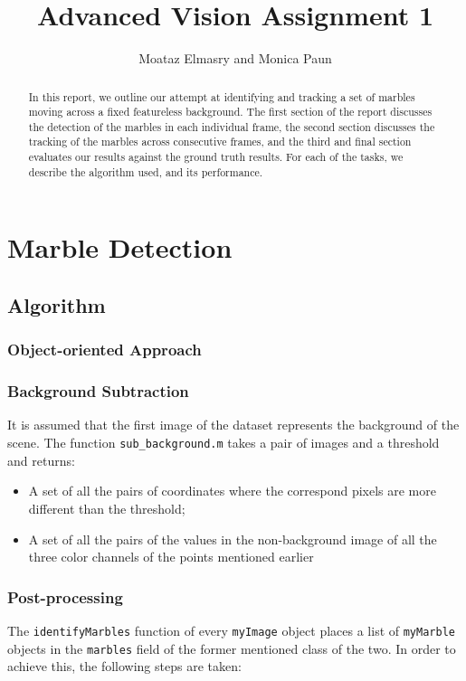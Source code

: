 \documentclass[10pt,a4paper,onecolumn]{report}
\author{Moataz Elmasry and Monica Paun}
\title{Advanced Vision Assignment 1}
\begin{document}
\lstset{language=Matlab} 

\maketitle

\begin{abstract}

In this report, we outline our attempt at identifying and tracking a set of marbles moving across a fixed featureless background. The first section of the report discusses the detection of the marbles in each individual frame, the second section discusses the tracking of the marbles across consecutive frames, and the third and final section evaluates our results against the ground truth results. For each of the tasks, we describe the algorithm used, and its performance.

\end{abstract}

\chapter{Marble Detection}

\section{Algorithm}

\subsection{Object-oriented Approach}

\subsection{Background Subtraction}
It is assumed that the first image of the dataset represents the background of the scene. The function \texttt{sub\_background.m} takes a pair of images and a threshold and returns:

\begin{itemize}
\item A set of all the pairs of coordinates where the correspond pixels are more different than the threshold;
\item A set of all the pairs of the values in the non-background image of all the three color channels of the points mentioned earlier 
\end{itemize}

\subsection{Post-processing}
The \texttt{identifyMarbles} function of every \texttt{myImage} object places a list of \texttt{myMarble} objects in the \texttt{marbles} field of the former mentioned class of the two. In order to achieve this, the following steps are taken:
\end{document}
